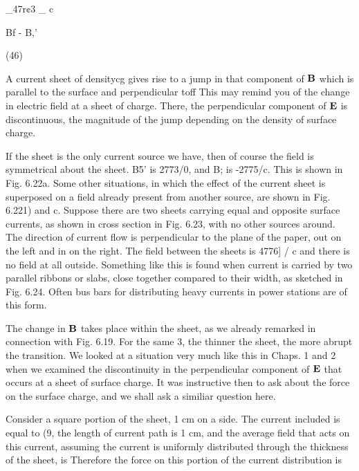 \begin{equation}
\end{equation}

_47r¢3
_ c

Bf - B,'

(46)

 
 

A current sheet of densitycg gives rise to a jump in that component
of $\mathbf{B}$ which is parallel to the surface and perpendicular toff This
may remind you of the change in electric field at a sheet of charge.
There, the perpendicular component of $\mathbf{E}$ is discontinuous, the magnitude
of the jump depending on the density of surface charge.

If the sheet is the only current source we have, then of course the
field is symmetrical about the sheet. B5' is 2773/0, and B; is
-2775/c. This is shown in Fig. 6.22a. Some other situations, in
which the effect of the current sheet is superposed on a field already
present from another source, are shown in Fig. 6.221) and c. Suppose
there are two sheets carrying equal and opposite surface currents, as
shown in cross section in Fig. 6.23, with no other sources around.
The direction of current flow is perpendicular to the plane of the
paper, out on the left and in on the right. The field between the sheets
is 4776] / c and there is no field at all outside. Something like this is
found when current is carried by two parallel ribbons or slabs, close
together compared to their width, as sketched in Fig. 6.24. Often bus
bars for distributing heavy currents in power stations are of this form.

The change in $\mathbf{B}$ takes place within the sheet, as we already remarked
in connection with Fig. 6.19. For the same 3, the thinner
the sheet, the more abrupt the transition. We looked at a situation
very much like this in Chaps. 1 and 2 when we examined the discontinuity
in the perpendicular component of $\mathbf{E}$ that occurs at a sheet
of surface charge. It was instructive then to ask about the force on
the surface charge, and we shall ask a similiar question here.

Consider a square portion of the sheet, 1 cm on a side. The current
included is equal to (9, the length of current path is 1 cm, and the
average field that acts on this current, assuming the current is uniformly
distributed through the thickness of the sheet, is %
Therefore the force on this portion of the current distribution is

